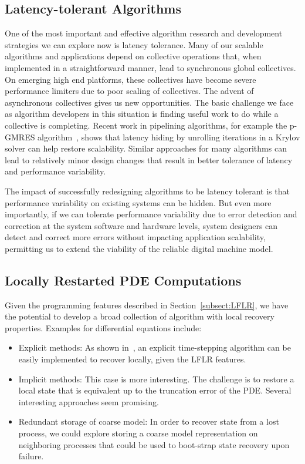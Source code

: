 \documentclass[10pt, twocolumn]{IEEEtran}
\begin{document}
\subsection{Latency-tolerant Algorithms}

One of the most important and effective algorithm research and development strategies we can explore now is latency tolerance.  Many of our scalable algorithms and applications depend on collective operations that, when implemented in a straightforward manner, lead to synchronous global collectives.  On emerging high end platforms, these collectives have become severe performance limiters due to poor scaling of collectives.  The advent of asynchronous collectives gives us new opportunities.  The basic challenge we face as algorithm developers in this situation is finding useful work to do while a collective is completing.  Recent work in pipelining algorithms, for example the p-GMRES algorithm~\cite{ghysels2012hiding}, shows that latency hiding by unrolling iterations in a Krylov solver can help restore scalability.  Similar approaches for many algorithms can lead to relatively minor design changes that result in better tolerance of latency and performance variability.

The impact of successfully redesigning algorithms to be latency tolerant is that performance variability on existing systems can be hidden.  But even more importantly, if we can tolerate performance variability due to error detection and correction at the system software and hardware levels, system designers can detect and correct more errors without impacting application scalability, permitting us to extend the viability of the reliable digital machine model.

\subsection{Locally Restarted PDE Computations}

Given the programming features described in Section~\ref{subsect:LFLR}, we have the potential to develop a broad collection of algorithm with local recovery properties.  Examples for differential equations include:
\begin{itemize}
\item Explicit methods:  As shown in~\cite{GokhaleWong2011}, an explicit time-stepping algorithm can be easily implemented to recover locally, given the LFLR features.
\item Implicit methods:  This case is more interesting.  The challenge is to restore a local state that is equivalent up to the truncation error of the PDE.  Several interesting approaches seem promising. 
\item Redundant storage of coarse model:  In order to recover state from a lost process, we could explore storing a coarse model representation on neighboring processes that could be used to boot-strap state recovery upon failure.
\end{itemize}
\end{document}
